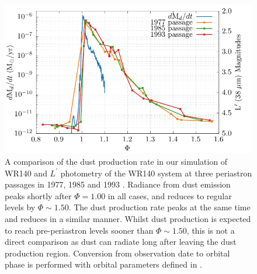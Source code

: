 \begin{figure}
  \centering
  \includegraphics{assets/fluxes/magnitudes.pdf}
  \caption[Comparison of simulation dust production rate and $L^\prime$ photometry]{A comparison of the dust production rate in our simulation of WR140 and $L^\prime$ photometry of the WR140 system at three periastron passages in 1977, 1985 and 1993 \parencite{crowther_dust_2003}. Radiance from dust emission peaks shortly after $\Phi = 1.00$ in all cases, and reduces to regular levels by $\Phi \sim 1.50$. The dust production rate peaks at the same time and reduces in a similar manner. Whilst dust production is expected to reach pre-periastron levels sooner than $\Phi \sim 1.50$, this is not a direct comparison as dust can radiate long after leaving the dust production region. Conversion from observation date to orbital phase is performed with orbital parameters defined in \textcite{fahedSpectroscopyArchetypeCollidingwind2011}.}
  \label{fig:wr140-lprime}
\end{figure}

